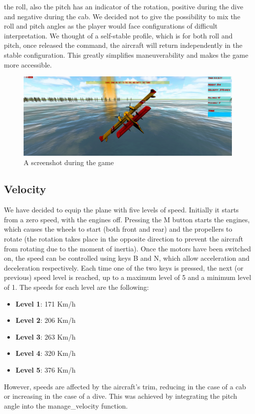 \documentclass{article}
\begin{document}
the roll, also the pitch has an indicator of the rotation, positive during the dive and negative during the cab. We decided not to give the possibility to mix the roll and pitch angles as the player would face configurations of difficult interpretation. We thought of a self-stable profile, which is for both roll and pitch, once released the command, the aircraft will return independently in the stable configuration. This greatly simplifies maneuverability and makes the game more accessible.

\begin{figure}[h!]
  \includegraphics[width=\linewidth]{schermata.png}
  \caption{A screenshot during the game}
\end{figure}
 

\subsection*{Velocity}
We have decided to equip the plane with five levels of speed. Initially it starts from a zero speed, with the engines off. Pressing the M button starts the engines, which causes the wheels to start (both front and rear) and the propellers to rotate (the rotation takes place in the opposite direction to prevent the aircraft from rotating due to the moment of inertia). Once the motors have been switched on, the speed can be controlled using keys B and N, which allow acceleration and deceleration respectively. Each time one of the two keys is pressed, the next (or previous) speed level is reached, up to a maximum level of 5 and a minimum level of 1. The speeds for each level are the following:
\begin{itemize}
\item \textbf{Level 1}: 171 Km/h
\item \textbf{Level 2}: 206 Km/h
\item \textbf{Level 3}: 263 Km/h
\item \textbf{Level 4}: 320 Km/h
\item \textbf{Level 5}: 376 Km/h
\end{itemize}
However, speeds are affected by the aircraft's trim, reducing in the case of a cab or increasing in the case of a dive. This was achieved by integrating the pitch angle into the manage\_velocity function.
\end{document}
